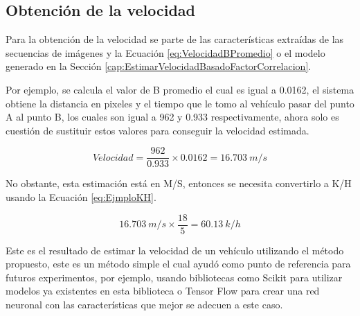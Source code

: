 \subsection{Obtención de la velocidad}

Para la obtención de la velocidad se parte de las características extraídas de las secuencias de imágenes y la Ecuación \ref{eq:VelocidadBPromedio} o el modelo generado en la Sección \ref{cap:EstimarVelocidadBasadoFactorCorrelacion}.

Por ejemplo, se calcula el valor de B promedio el cual es igual a 0.0162, el sistema obtiene la distancia en pixeles y el tiempo que le tomo al vehículo pasar del punto A al punto B, los cuales son igual a 962 y 0.933 respectivamente, ahora solo es cuestión de sustituir estos valores para conseguir la velocidad estimada.

\begin{equation}
    \label{eq:EjemploImplementacion}
    Velocidad = \frac{962 }{0.933} \times 0.0162 = 16.703 \: m/s
\end{equation}


No obstante, esta estimación está en M/S, entonces se necesita convertirlo a K/H usando la Ecuación \ref{eq:EjmploKH}.

\begin{equation}
    \label{eq:EjmploKH}
     16.703\:m/s\times \frac{18}{5} = 60.13 \: k/h
\end{equation}

Este es el resultado de estimar la velocidad de un vehículo utilizando el método propuesto, este es un método simple el cual ayudó como punto de referencia para futuros experimentos, por ejemplo, usando bibliotecas como Scikit para utilizar modelos ya existentes en esta biblioteca o Tensor Flow para crear una red neuronal con las características que mejor se adecuen a este caso.
